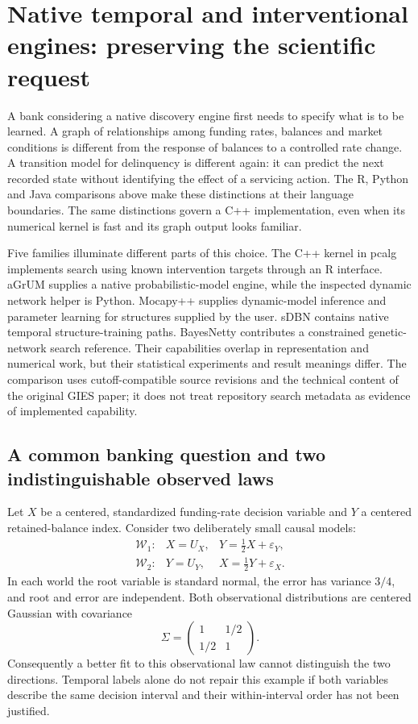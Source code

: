 \section{Native temporal and interventional engines: preserving the scientific request}
\label{exec16:cxx-temporal}

A bank considering a native discovery engine first needs to specify what is
to be learned. A graph of relationships among funding rates, balances and
market conditions is different from the response of balances to a controlled
rate change. A transition model for delinquency is different again: it can
predict the next recorded state without identifying the effect of a servicing
action. The R, Python and Java comparisons above make these distinctions at
their language boundaries. The same distinctions govern a C++ implementation,
even when its numerical kernel is fast and its graph output looks familiar.

Five families illuminate different parts of this choice. The C++ kernel in
pcalg implements search using known intervention targets through an R interface.
aGrUM supplies a native probabilistic-model engine, while the inspected dynamic
network helper is Python. Mocapy++ supplies dynamic-model inference and parameter
learning for structures supplied by the user. sDBN contains native temporal
structure-training paths. BayesNetty contributes a constrained genetic-network
search reference. Their capabilities overlap in representation and numerical
work, but their statistical experiments and result meanings differ.
The comparison uses cutoff-compatible source revisions and the technical
content of the original GIES paper; it does not treat repository search
metadata as evidence of implemented capability. \citep{exec16_ct_pcalg,exec16_ct_agrum,exec16_ct_mocapy,exec16_ct_sdbn,exec16_ct_bayesnetty,exec14_pt_paper_gies}

\subsection{A common banking question and two indistinguishable observed laws}

Let $X$ be a centered, standardized funding-rate decision variable and $Y$ a
centered retained-balance index. Consider two deliberately small causal models:
\[
 \begin{array}{lll}
 \mathcal W_1:&X=U_X,&Y=\tfrac12X+\varepsilon_Y,\\
 \mathcal W_2:&Y=U_Y,&X=\tfrac12Y+\varepsilon_X.
 \end{array}
\]
In each world the root variable is standard normal, the error has variance
$3/4$, and root and error are independent. Both observational distributions
are centered Gaussian with covariance
\[
 \Sigma=\begin{pmatrix}1&1/2\\1/2&1\end{pmatrix}.
\]
Consequently a better fit to this observational law cannot distinguish the
two directions. Temporal labels alone do not repair this example if both
variables describe the same decision interval and their within-interval order
has not been justified.


